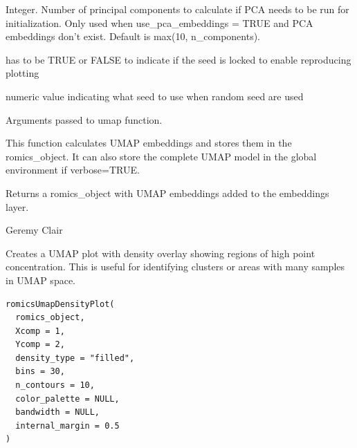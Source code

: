 \documentclass[a4paper]{book}
\begin{document}
\begin{Arguments}
\begin{ldescription}
\item[\code{pca\_ncp}] Integer. Number of principal components to calculate if PCA needs to be run for initialization.
Only used when use\_pca\_embeddings = TRUE and PCA embeddings don't exist. Default is max(10, n\_components).

\item[\code{lock.seed}] has to be TRUE or FALSE to indicate if the seed is locked to enable reproducing plotting

\item[\code{seed}] numeric value indicating what seed to use when random seed are used

\item[\code{...}] Arguments passed to umap function.
\end{ldescription}
\end{Arguments}
%
\begin{Details}
This function calculates UMAP embeddings and stores them in the romics\_object. It can also store the complete
UMAP model in the global environment if verbose=TRUE.
\end{Details}
%
\begin{Value}
Returns a romics\_object with UMAP embeddings added to the embeddings layer.
\end{Value}
%
\begin{Author}
Geremy Clair
\end{Author}
%
\begin{Description}
Creates a UMAP plot with density overlay showing regions of high point concentration.
This is useful for identifying clusters or areas with many samples in UMAP space.
\end{Description}
%
\begin{Usage}
\begin{verbatim}
romicsUmapDensityPlot(
  romics_object,
  Xcomp = 1,
  Ycomp = 2,
  density_type = "filled",
  bins = 30,
  n_contours = 10,
  color_palette = NULL,
  bandwidth = NULL,
  internal_margin = 0.5
)
\end{verbatim}
\end{Usage}
%
\end{document}
